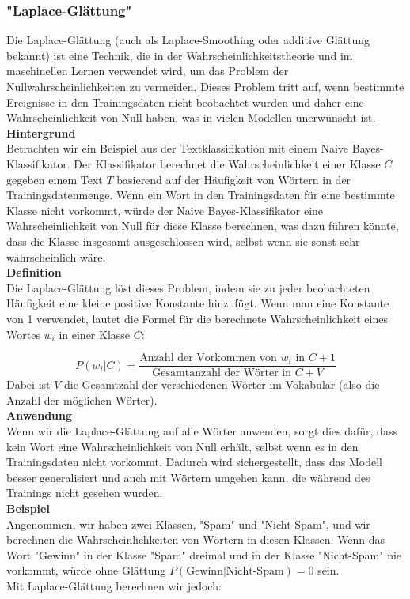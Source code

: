 \documentclass[12pt]{article}
\begin{document}
\subsubsection{"Laplace-Glättung"}
Die Laplace-Glättung (auch als Laplace-Smoothing oder additive Glättung bekannt) ist eine Technik, die in der Wahrscheinlichkeitstheorie und im maschinellen Lernen verwendet wird, um das Problem der Nullwahrscheinlichkeiten zu vermeiden. Dieses Problem tritt auf, wenn bestimmte Ereignisse in den Trainingsdaten nicht beobachtet wurden und daher eine Wahrscheinlichkeit von Null haben, was in vielen Modellen unerwünscht ist.\\
%
\textbf{Hintergrund}\\
Betrachten wir ein Beispiel aus der Textklassifikation mit einem Naive Bayes-Klassifikator. Der Klassifikator berechnet die Wahrscheinlichkeit einer Klasse \(C\) gegeben einem Text \(T\) basierend auf der Häufigkeit von Wörtern in der Trainingsdatenmenge. Wenn ein Wort in den Trainingsdaten für eine bestimmte Klasse nicht vorkommt, würde der Naive Bayes-Klassifikator eine Wahrscheinlichkeit von Null für diese Klasse berechnen, was dazu führen könnte, dass die Klasse insgesamt ausgeschlossen wird, selbst wenn sie sonst sehr wahrscheinlich wäre.\\
%
\textbf{Definition}\\
Die Laplace-Glättung löst dieses Problem, indem sie zu jeder beobachteten Häufigkeit eine kleine positive Konstante hinzufügt. Wenn man eine Konstante von 1 verwendet, lautet die Formel für die berechnete Wahrscheinlichkeit eines Wortes \( w_i \) in einer Klasse \( C \):

\[
P(w_i|C) = \frac{\text{Anzahl der Vorkommen von } w_i \text{ in } C + 1}{\text{Gesamtanzahl der Wörter in } C + V}
\]
Dabei ist \( V \) die Gesamtzahl der verschiedenen Wörter im Vokabular (also die Anzahl der möglichen Wörter).\\
%
\textbf{Anwendung}\\
%
Wenn wir die Laplace-Glättung auf alle Wörter anwenden, sorgt dies dafür, dass kein Wort eine Wahrscheinlichkeit von Null erhält, selbst wenn es in den Trainingsdaten nicht vorkommt. Dadurch wird sichergestellt, dass das Modell besser generalisiert und auch mit Wörtern umgehen kann, die während des Trainings nicht gesehen wurden.\\
%
\textbf{Beispiel}\\
Angenommen, wir haben zwei Klassen, "Spam" und "Nicht-Spam", und wir berechnen die Wahrscheinlichkeiten von Wörtern in diesen Klassen. Wenn das Wort "Gewinn" in der Klasse "Spam" dreimal und in der Klasse "Nicht-Spam" nie vorkommt, würde ohne Glättung \( P(\text{Gewinn}|\text{Nicht-Spam}) = 0 \) sein. \\
Mit Laplace-Glättung berechnen wir jedoch:
\end{document}
